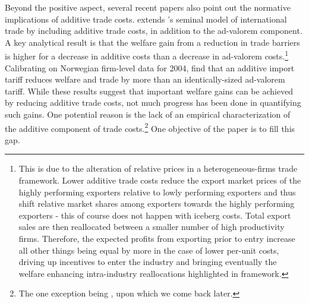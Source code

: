 \documentclass[a4paper,11pt]{article}
\begin{document}
Beyond the positive aspect, several recent papers also point out the normative implications of additive trade costs. \citet{sorensen2014} extends \citet{melitz}'s seminal model of international trade by including additive trade costs, in addition to the ad-valorem component. A key analytical result is that the welfare gain from a reduction in trade barriers is higher for a decrease in additive costs than a decrease in ad-valorem costs.\footnote{This is due to the alteration of relative prices in a heterogeneous-firms trade framework. Lower additive trade costs reduce the export market prices of the highly performing exporters relative to lowly performing exporters and thus shift relative market shares among exporters towards the highly performing exporters - this of course does not happen with iceberg costs. Total export sales are then reallocated between a smaller number of high productivity firms. Therefore, the expected profits from exporting prior to entry increase all other things being equal by more in the case of lower per-unit costs, driving up incentives to enter the industry and bringing eventually the welfare enhancing intra-industry reallocations highlighted in \citet{melitz} framework.} Calibrating on Norwegian firm-level data for 2004, \citet{Irrazabal_2015} find that an additive import tariff reduces welfare and trade by more than an identically-sized ad-valorem tariff. While these results suggest that important welfare gains can be achieved by reducing additive trade costs, not much progress has been done in quantifying such gains. One potential reason is the lack of an empirical characterization of the additive component of trade costs.\footnote{The one exception being \citet{Irrazabal_2015}, upon which we come back later.} One objective of the paper is to fill this gap. \bigskip
\end{document}
